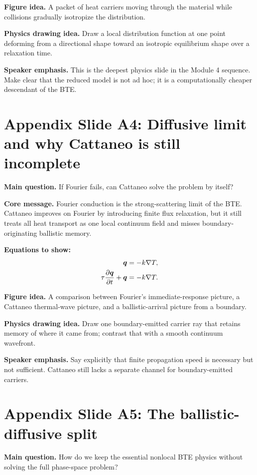 \documentclass[11pt]{article}
\begin{document}
\textbf{Figure idea.} A packet of heat carriers moving through the material while collisions gradually isotropize the distribution.

\textbf{Physics drawing idea.} Draw a local distribution function at one point deforming from a directional shape toward an isotropic equilibrium shape over a relaxation time.

\textbf{Speaker emphasis.} This is the deepest physics slide in the Module 4 sequence. Make clear that the reduced model is not ad hoc; it is a computationally cheaper descendant of the BTE.

\section{Appendix Slide A4: Diffusive limit and why Cattaneo is still incomplete}
\begin{physicsbox}
\textbf{Main question.} If Fourier fails, can Cattaneo solve the problem by itself?
\end{physicsbox}

\textbf{Core message.} Fourier conduction is the strong-scattering limit of the BTE. Cattaneo improves on Fourier by introducing finite flux relaxation, but it still treats all heat transport as one local continuum field and misses boundary-originating ballistic memory.

\textbf{Equations to show:}
\begin{align*}
\bm{q}&=-k\nabla T,\\
\tau\frac{\partial \bm{q}}{\partial t}+\bm{q}&=-k\nabla T.
\end{align*}

\textbf{Figure idea.} A comparison between Fourier's immediate-response picture, a Cattaneo thermal-wave picture, and a ballistic-arrival picture from a boundary.

\textbf{Physics drawing idea.} Draw one boundary-emitted carrier ray that retains memory of where it came from; contrast that with a smooth continuum wavefront.

\textbf{Speaker emphasis.} Say explicitly that finite propagation speed is necessary but not sufficient. Cattaneo still lacks a separate channel for boundary-emitted carriers.

\section{Appendix Slide A5: The ballistic-diffusive split}
\begin{physicsbox}
\textbf{Main question.} How do we keep the essential nonlocal BTE physics without solving the full phase-space problem?
\end{physicsbox}
\end{document}
